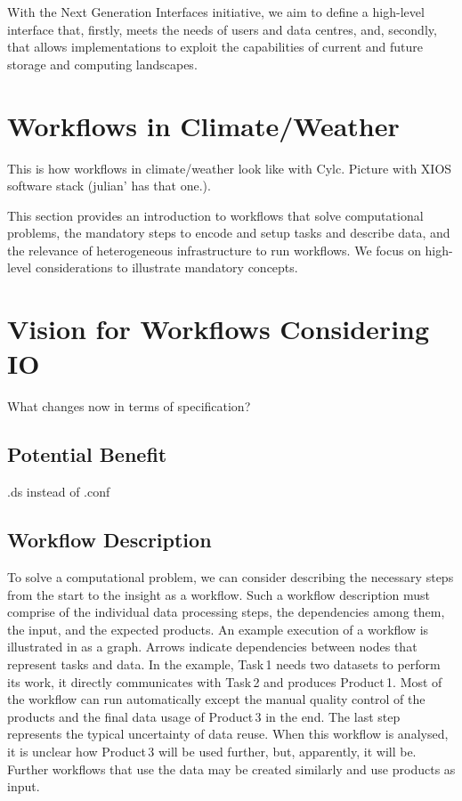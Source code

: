 \documentclass[a4paper]{article}
\begin{document}
{{With the Next Generation Interfaces initiative, we aim to define a high-level interface that, firstly, meets the needs of users and data centres, and, secondly, that allows implementations to exploit the capabilities of current and future storage and computing landscapes.


\section{Workflows in Climate/Weather}

This is how workflows in climate/weather look like with Cylc.
Picture with XIOS software stack (julian' has that one.).

This section provides an introduction to workflows that solve computational problems, the mandatory steps to encode and setup tasks and describe data, and the relevance of heterogeneous infrastructure to run workflows.
We focus on high-level considerations to illustrate mandatory concepts.



\section{Vision for Workflows Considering IO}

What changes now in terms of specification?

\subsection{Potential Benefit}

.ds instead of .conf


\subsection{Workflow Description}

To solve a computational problem, we can consider describing the necessary steps from the start to the insight as a workflow.
Such a workflow description must comprise of the individual data processing steps, the dependencies among them, the input, and the expected products. An example execution of a workflow is illustrated in  as a graph.
Arrows indicate dependencies between nodes that represent tasks and data.
In the example, Task\,1 needs two datasets to perform its work, it directly communicates with Task\,2 and produces Product\,1.
Most of the workflow can run automatically except the manual quality control of the products and the final data usage of Product\,3 in the end.
The last step represents the typical uncertainty of data reuse. When this workflow is analysed, it is unclear how Product\,3 will be used further, but, apparently, it will be.
Further workflows that use the data may be created similarly and use products as input.

}}
\end{document}
